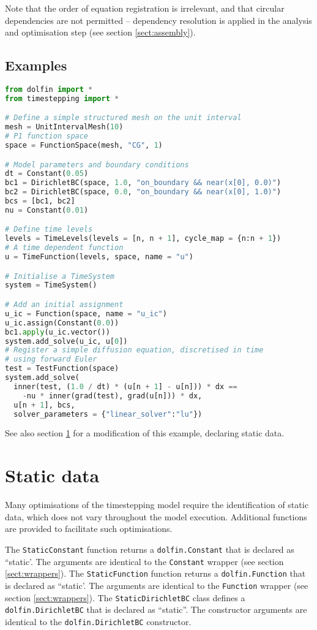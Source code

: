 \documentclass[a4paper]{book}
\begin{document}
Note that the order of equation registration is irrelevant, and that
circular dependencies are not permitted -- dependency resolution is applied in
the analysis and optimisation step (see section \ref{sect:assembly}).

\subsection*{Examples}

\begin{lstlisting}[language = python, frame = single, basicstyle=\footnotesize]
from dolfin import *
from timestepping import *

# Define a simple structured mesh on the unit interval
mesh = UnitIntervalMesh(10)
# P1 function space
space = FunctionSpace(mesh, "CG", 1)

# Model parameters and boundary conditions
dt = Constant(0.05)
bc1 = DirichletBC(space, 1.0, "on_boundary && near(x[0], 0.0)")
bc2 = DirichletBC(space, 0.0, "on_boundary && near(x[0], 1.0)")
bcs = [bc1, bc2]
nu = Constant(0.01)

# Define time levels
levels = TimeLevels(levels = [n, n + 1], cycle_map = {n:n + 1})
# A time dependent function
u = TimeFunction(levels, space, name = "u")

# Initialise a TimeSystem
system = TimeSystem()

# Add an initial assignment
u_ic = Function(space, name = "u_ic")
u_ic.assign(Constant(0.0))
bc1.apply(u_ic.vector())
system.add_solve(u_ic, u[0])
# Register a simple diffusion equation, discretised in time
# using forward Euler
test = TestFunction(space)
system.add_solve(
  inner(test, (1.0 / dt) * (u[n + 1] - u[n])) * dx ==
    -nu * inner(grad(test), grad(u[n])) * dx,
  u[n + 1], bcs,
  solver_parameters = {"linear_solver":"lu"})
\end{lstlisting}
See also section \ref{sect:statics} for a modification of this example,
declaring static data.

\section{Static data}\label{sect:statics}

Many optimisations of the timestepping model require the identification of
static data, which does not vary throughout the model execution. Additional
functions are provided to facilitate such optimisations.

The \verb+StaticConstant+ function returns a \verb+dolfin.Constant+ that is
declared as ``static'. The arguments are identical to the \verb+Constant+
wrapper (see section \ref{sect:wrappers}). The \verb+StaticFunction+ function
returns a \verb+dolfin.Function+ that is declared as ``static'. The arguments
are identical to the \verb+Function+ wrapper (see section
\ref{sect:wrappers}). The \verb+StaticDirichletBC+ class defines a
\verb+dolfin.DirichletBC+ that is declared as ``static''. The constructor
arguments are identical to the \verb+dolfin.DirichletBC+ constructor.
\end{document}
